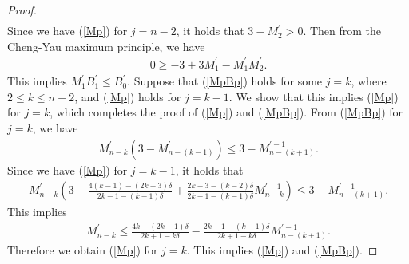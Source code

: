 \documentclass[12pt]{article}
\theoremstyle{definition}
\begin{document}
\begin{proof}
\begin{align*}
\end{align*}
Since we have (\ref{Mp}) for $j=n-2$, it holds that $3-M_2^\prime>0$. Then from the Cheng-Yau maximum principle, we have
\begin{align*}
0\geq -3+3M_1^\prime -M_1^\prime M_2^\prime.
\end{align*}
This implies $M_1^\prime B_1^\prime\leq B_0^\prime$. Suppose that (\ref{MpBp}) holds for some $j=k$, where $2\leq k\leq n-2$, and (\ref{Mp}) holds for $j=k-1$. We show that this implies (\ref{Mp}) for $j=k$, which completes the proof of (\ref{Mp}) and (\ref{MpBp}). From (\ref{MpBp}) for $j=k$, we have
\begin{align*}
M_{n-k}^\prime(3-M_{n-(k-1)}^\prime)\leq {3-M_{n-(k+1)}^{\prime-1}}.
\end{align*}
Since we have (\ref{Mp}) for $j=k-1$, it holds that
\begin{align*}
M_{n-k}^\prime\left(3-\frac{4(k-1)-(2k-3)\delta}{2k-1-(k-1)\delta}+\frac{2k-3-(k-2)\delta}{2k-1-(k-1)\delta}M_{n-k}^{\prime-1}\right)\leq {3-M_{n-(k+1)}^{\prime-1}}.
\end{align*}
This implies
\begin{align*}
M_{n-k}^\prime \leq \frac{4k-(2k-1)\delta}{2k+1-k\delta}-\frac{2k-1-(k-1)\delta}{2k+1-k\delta}M_{n-(k+1)}^{\prime-1}.
\end{align*}
Therefore we obtain (\ref{Mp}) for $j=k$. This implies (\ref{Mp}) and (\ref{MpBp}). 
\end{proof}
\end{document}
